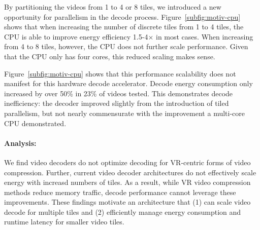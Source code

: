 By partitioning the videos from 1 to 4 or 8 tiles, we introduced a new opportunity for parallelism in the decode process.
Figure~\ref{subfig:motiv-cpu} shows that when increasing the number of discrete tiles from 1 to 4 tiles, the CPU is able to improve energy efficiency 1.5-4$\times$ in most cases.
When increasing from 4 to 8 tiles, however, the CPU does not further scale performance.
Given that the CPU only has four cores, this reduced scaling makes sense.


%
%
Figure~\ref{subfig:motiv-cpu} shows that this performance scalability does not manifest for this hardware decode accelerator.
Decode energy consumption only increased by over 50\% in 23\% of videos tested.
This demonstrates decode inefficiency: the decoder improved slightly from the introduction of tiled parallelism, but not nearly commensurate with the improvement a multi-core CPU demonstrated.

\paragraph{Analysis: } We find video decoders do not optimize decoding for VR-centric forms of video compression.
Further, current video decoder architectures do not effectively scale energy with increasd numbers of tiles.
As a result, while VR video compression methods reduce memory traffic, decode performance cannot leverage these improvements.
These findings motivate an architecture that (1) can scale video decode for multiple tiles and (2) efficiently manage energy consumption and runtime latency for smaller video tiles.
